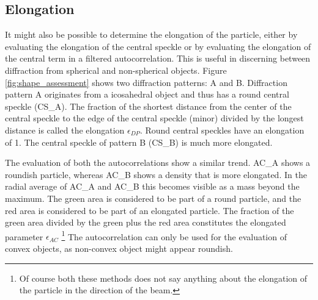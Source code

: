 \subsection{Elongation}

It might also be possible to determine the elongation of the particle, either by evaluating the elongation of the central speckle \cite{Hantke2014,Daurer2017} or by evaluating the elongation of the central term in a filtered autocorrelation. This is useful in discerning between diffraction from spherical and non-spherical objects. Figure \ref{fig:shape_assessment} shows two diffraction patterns: A and B. Diffraction pattern A originates from a icosahedral object and thus has a round central speckle (CS\_A). The fraction of the shortest distance from the center of the central speckle to the edge of the central speckle (minor) divided by the longest distance is called the elongation $\epsilon_{DP}$. Round central speckles have an elongation of 1. The central speckle of pattern B (CS\_B) is much more elongated. 

The evaluation of both the autocorrelations show a similar trend. AC\_A shows a roundish particle, whereas AC\_B shows a density that is more elongated. In the radial average of AC\_A and AC\_B this becomes visible as a mass beyond the maximum. The green area is considered to be part of a round particle, and the red area is considered to be part of an elongated particle. The fraction of the green area divided by the green plus the red area constitutes the elongated parameter $\epsilon_{AC}$ \footnote{Of course both these methods does not say anything about the elongation of the particle in the direction of the beam.
} The autocorrelation can only be used for the evaluation of convex objects, as non-convex object might appear roundish. 

